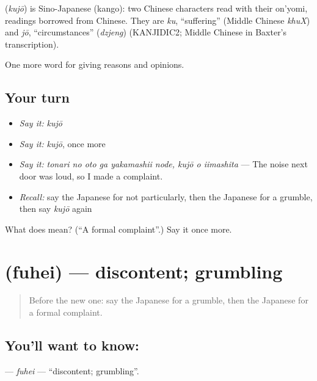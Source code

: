 \begin{cousinweb}
\textbf{} (\emph{kujō}) is Sino-Japanese (kango): two Chinese characters read with their on'yomi, readings borrowed from Chinese. They are \emph{ku}, \textquotedblleft{}suffering\textquotedblright{} (Middle Chinese \emph{khuX}) and \emph{jō}, \textquotedblleft{}circumstances\textquotedblright{} (\emph{dzjeng}) (KANJIDIC2; Middle Chinese in Baxter's transcription).
\end{cousinweb}

\begin{grammarlens}[title={What you've built}]
One more word for giving reasons and opinions.
\end{grammarlens}

\subsection*{Your turn}
\begin{itemize}
\raggedright
  \item \emph{Say it:} \emph{kujō}
  \item \emph{Say it:} \emph{kujō}, once more
  \item \emph{Say it:} \emph{tonari no oto ga yakamashii node, kujō o iimashita} — The noise next door was loud, so I made a complaint.
  \item \emph{Recall:} say the Japanese for not particularly, then the Japanese for a grumble, then say \emph{kujō} again
\end{itemize}

\begin{tcolorbox}[breakable,colback=teal!4,colframe=teal!35!black,title={Before you move on}]
What does  mean? (\textquotedblleft{}A formal complaint\textquotedblright{}.) Say it once more.
\end{tcolorbox}
\section[\texorpdfstring{\ja{ふへい} (fuhei)}{ふへい (fuhei)}]{ (fuhei) — discontent; grumbling}

\label{lesson:JA-C324-fuhei}



\begin{quote}
Before the new one: say the Japanese for a grumble, then the Japanese for a formal complaint.
\end{quote}

\subsection*{You'll want to know: }
\textbf{} — \emph{fuhei} — \textquotedblleft{}discontent; grumbling\textquotedblright{}.

